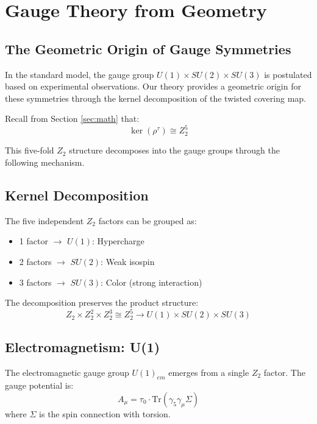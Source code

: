 \section{Gauge Theory from Geometry}
\label{sec:gauge}

\subsection{The Geometric Origin of Gauge Symmetries}

In the standard model, the gauge group $U(1) \times SU(2) \times SU(3)$ is postulated based on experimental observations. Our theory provides a geometric origin for these symmetries through the kernel decomposition of the twisted covering map.

Recall from Section \ref{sec:math} that:
\begin{equation}
    \ker(\rho^\tau) \cong Z_2^5
\end{equation}

This five-fold $Z_2$ structure decomposes into the gauge groups through the following mechanism.

\subsection{Kernel Decomposition}

The five independent $Z_2$ factors can be grouped as:
\begin{itemize}
    \item 1 factor $\to$ $U(1)$: Hypercharge
    \item 2 factors $\to$ $SU(2)$: Weak isospin  
    \item 3 factors $\to$ $SU(3)$: Color (strong interaction)
\end{itemize}

The decomposition preserves the product structure:
\begin{equation}
    Z_2 \times Z_2^2 \times Z_2^3 \cong Z_2^5 \to U(1) \times SU(2) \times SU(3)
\end{equation}

\subsection{Electromagnetism: U(1)}

The electromagnetic gauge group $U(1)_{em}$ emerges from a single $Z_2$ factor. The gauge potential is:
\begin{equation}
    A_\mu = \tau_0 \cdot \text{Tr}(\gamma_5 \gamma_\mu \Sigma)
\end{equation}
where $\Sigma$ is the spin connection with torsion.

